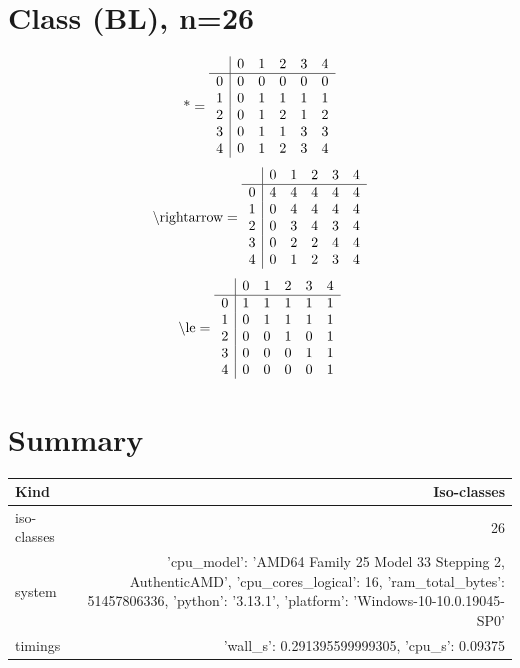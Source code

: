\documentclass[11pt]{article}
\begin{document}
\section{Class (BL), n=26}
\[\text{*} = 
\begin{array}{r | r r r r r}
 & 0 & 1 & 2 & 3 & 4 \\ \hline
0 & 0 & 0 & 0 & 0 & 0 \\
1 & 0 & 1 & 1 & 1 & 1 \\
2 & 0 & 1 & 2 & 1 & 2 \\
3 & 0 & 1 & 1 & 3 & 3 \\
4 & 0 & 1 & 2 & 3 & 4 \\
\end{array}
\]
\[\text{\textbackslash rightarrow} = 
\begin{array}{r | r r r r r}
 & 0 & 1 & 2 & 3 & 4 \\ \hline
0 & 4 & 4 & 4 & 4 & 4 \\
1 & 0 & 4 & 4 & 4 & 4 \\
2 & 0 & 3 & 4 & 3 & 4 \\
3 & 0 & 2 & 2 & 4 & 4 \\
4 & 0 & 1 & 2 & 3 & 4 \\
\end{array}
\]
\[\text{\textbackslash le} = 
\begin{array}{r | r r r r r}
 & 0 & 1 & 2 & 3 & 4 \\ \hline
0 & 1 & 1 & 1 & 1 & 1 \\
1 & 0 & 1 & 1 & 1 & 1 \\
2 & 0 & 0 & 1 & 0 & 1 \\
3 & 0 & 0 & 0 & 1 & 1 \\
4 & 0 & 0 & 0 & 0 & 1 \\
\end{array}
\]

\section*{Summary}
\begin{tabular}{lr}
\toprule
Kind & Iso-classes\\\midrule
iso-classes & 26\\
system & {'cpu_model': 'AMD64 Family 25 Model 33 Stepping 2, AuthenticAMD', 'cpu_cores_logical': 16, 'ram_total_bytes': 51457806336, 'python': '3.13.1', 'platform': 'Windows-10-10.0.19045-SP0'}\\
timings & {'wall_s': 0.291395599999305, 'cpu_s': 0.09375}\\
\bottomrule
\end{tabular}
\end{document}
